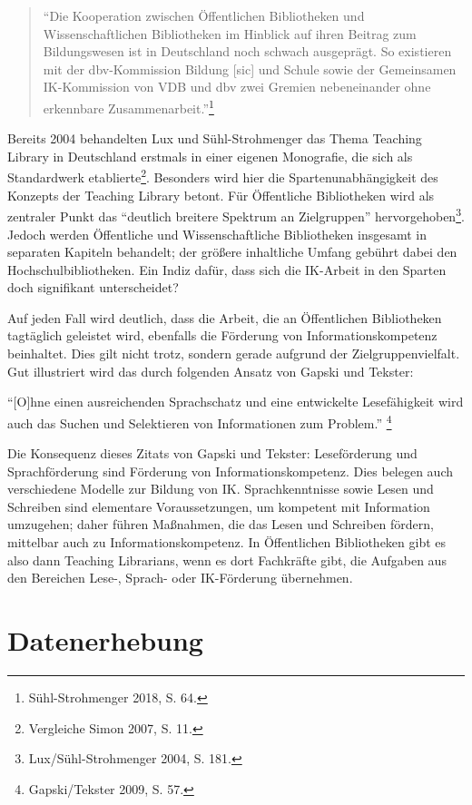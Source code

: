\documentclass[a4paper,
fontsize=11pt,
oneside,
numbers=noperiodatend,
parskip=half-,
bibliography=totoc,
final
]{scrartcl}
\begin{document}
\begin{quote}
\enquote{Die Kooperation zwischen Öffentlichen Bibliotheken und
Wissenschaftlichen Bibliotheken im Hinblick auf ihren Beitrag zum
Bildungswesen ist in Deutschland noch schwach ausgeprägt. So existieren
mit der dbv-Kommission Bildung {[}sic{]} und Schule sowie der
Gemeinsamen IK-Kommission von VDB und dbv zwei Gremien nebeneinander
ohne erkennbare Zusammenarbeit.}\footnote{Sühl-Strohmenger 2018, S. 64.}
\end{quote}

Bereits 2004 behandelten Lux und Sühl-Strohmenger das Thema Teaching
Library in Deutschland erstmals in einer eigenen Monografie, die sich
als Standardwerk etablierte\footnote{Vergleiche Simon 2007, S. 11.}.
Besonders wird hier die Spartenunabhängigkeit des Konzepts der Teaching
Library betont. Für Öffentliche Bibliotheken wird als zentraler Punkt
das \enquote{deutlich breitere Spektrum an Zielgruppen}
hervorgehoben\footnote{Lux/Sühl-Strohmenger 2004, S. 181.}. Jedoch
werden Öffentliche und Wissenschaftliche Bibliotheken insgesamt in
separaten Kapiteln behandelt; der größere inhaltliche Umfang gebührt
dabei den Hochschulbibliotheken. Ein Indiz dafür, dass sich die
IK-Arbeit in den Sparten doch signifikant unterscheidet?

Auf jeden Fall wird deutlich, dass die Arbeit, die an Öffentlichen
Bibliotheken tagtäglich geleistet wird, ebenfalls die Förderung von
Informationskompetenz beinhaltet. Dies gilt nicht trotz, sondern gerade
aufgrund der Zielgruppenvielfalt. Gut illustriert wird das durch
folgenden Ansatz von Gapski und Tekster:

\enquote{{[}O{]}hne einen ausreichenden Sprachschatz und eine
entwickelte Lesefähigkeit wird auch das Suchen und Selektieren von
Informationen zum Problem.} \footnote{Gapski/Tekster 2009, S. 57.}

Die Konsequenz dieses Zitats von Gapski und Tekster: Leseförderung und
Sprachförderung sind Förderung von Informationskompetenz. Dies belegen
auch verschiedene Modelle zur Bildung von IK. Sprachkenntnisse sowie
Lesen und Schreiben sind elementare Voraussetzungen, um kompetent mit
Information umzugehen; daher führen Maßnahmen, die das Lesen und
Schreiben fördern, mittelbar auch zu Informationskompetenz. In
Öffentlichen Bibliotheken gibt es also dann Teaching Librarians, wenn es
dort Fachkräfte gibt, die Aufgaben aus den Bereichen Lese-, Sprach- oder
IK-Förderung übernehmen.

\hypertarget{datenerhebung}{%
\section{Datenerhebung}\label{datenerhebung}}
\end{document}
